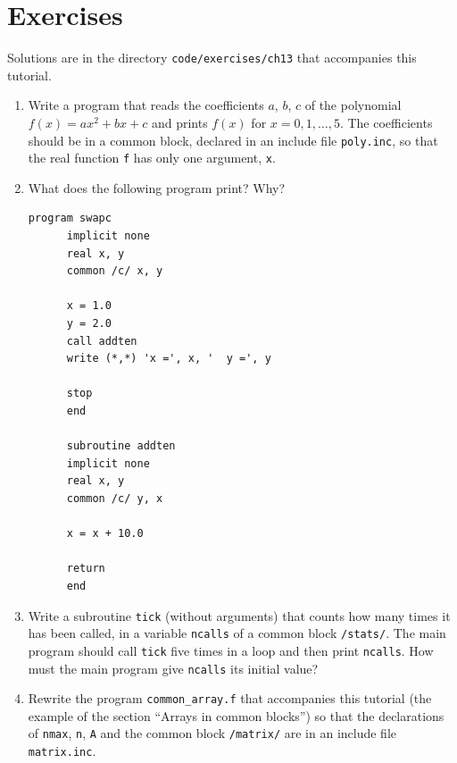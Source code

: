 \section{Exercises}

Solutions are in the directory \texttt{code/exercises/ch13} that accompanies this tutorial.

\begin{enumerate}
    \item Write a program that reads the coefficients $a$, $b$, $c$ of the polynomial $f(x) = ax^2 + bx + c$ and prints $f(x)$ for $x = 0, 1, \ldots, 5$. The coefficients should be in a common block, declared in an include file \texttt{poly.inc}, so that the real function \texttt{f} has only one argument, \texttt{x}.
    \item What does the following program print? Why?

\begin{lstlisting}[style=fortran77]
      program swapc
      implicit none
      real x, y
      common /c/ x, y

      x = 1.0
      y = 2.0
      call addten
      write (*,*) 'x =', x, '  y =', y

      stop
      end

      subroutine addten
      implicit none
      real x, y
      common /c/ y, x

      x = x + 10.0

      return
      end
\end{lstlisting}

    \item Write a subroutine \texttt{tick} (without arguments) that counts how many times it has been called, in a variable \texttt{ncalls} of a common block \texttt{/stats/}. The main program should call \texttt{tick} five times in a loop and then print \texttt{ncalls}. How must the main program give \texttt{ncalls} its initial value?
    \item Rewrite the program \texttt{common\_array.f} that accompanies this tutorial (the example of the section ``Arrays in common blocks'') so that the declarations of \texttt{nmax}, \texttt{n}, \texttt{A} and the common block \texttt{/matrix/} are in an include file \texttt{matrix.inc}.
\end{enumerate}
